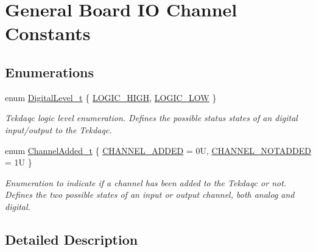 \hypertarget{group__board__channel__constants}{\section{General Board I\-O Channel Constants}
\label{group__board__channel__constants}
}
\subsection*{Enumerations}
\begin{DoxyCompactItemize}
\item 
enum \hyperlink{group__board__channel__constants_gaee574a0d48c41a3e5426ffbf8ac4c5c4}{Digital\-Level\-\_\-t} \{ \hyperlink{group__board__channel__constants_ggaee574a0d48c41a3e5426ffbf8ac4c5c4ad49fd7cec8a5997c9347759048470fc9}{L\-O\-G\-I\-C\-\_\-\-H\-I\-G\-H}, 
\hyperlink{group__board__channel__constants_ggaee574a0d48c41a3e5426ffbf8ac4c5c4ab4d04526d504d52286c0125def0faef4}{L\-O\-G\-I\-C\-\_\-\-L\-O\-W}
 \}
\begin{DoxyCompactList}\small\item\em Tekdaqc logic level enumeration. Defines the possible status states of an digital input/output to the Tekdaqc. \end{DoxyCompactList}\item 
enum \hyperlink{group__board__channel__constants_gab0f30599ceb99e5ba3b2908d8e9bd131}{Channel\-Added\-\_\-t} \{ \hyperlink{group__board__channel__constants_ggab0f30599ceb99e5ba3b2908d8e9bd131aaee2b8395093e69408a16f6981d07fa9}{C\-H\-A\-N\-N\-E\-L\-\_\-\-A\-D\-D\-E\-D} = 0\-U, 
\hyperlink{group__board__channel__constants_ggab0f30599ceb99e5ba3b2908d8e9bd131a4ecfadabb635f0b5dd33b66498b2d04f}{C\-H\-A\-N\-N\-E\-L\-\_\-\-N\-O\-T\-A\-D\-D\-E\-D} = 1\-U
 \}
\begin{DoxyCompactList}\small\item\em Enumeration to indicate if a channel has been added to the Tekdaqc or not. Defines the two possible states of an input or output channel, both analog and digital. \end{DoxyCompactList}\end{DoxyCompactItemize}


\subsection{Detailed Description}


